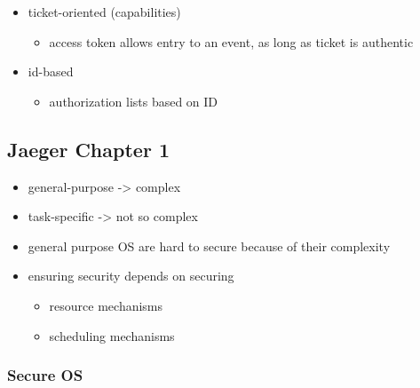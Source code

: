 \documentclass[
  12pt]{findlay}
\providecommand{\tightlist}{%
  \setlength{\itemsep}{0pt}\setlength{\parskip}{0pt}}
\begin{document}
\begin{itemize}
  \begin{itemize}
  \tightlist
  \item
    ticket-oriented (capabilities)

    \begin{itemize}
    \tightlist
    \item
      access token allows entry to an event, as long as ticket is
      authentic
    \end{itemize}
  \item
    id-based

    \begin{itemize}
    \tightlist
    \item
      authorization lists based on ID
    \end{itemize}
  \end{itemize}
\end{itemize}

\hypertarget{jaeger-chapter-1}{%
\subsection{Jaeger Chapter 1}\label{jaeger-chapter-1}}

\begin{itemize}
\tightlist
\item
  general-purpose -\textgreater{} complex
\item
  task-specific -\textgreater{} not so complex
\item
  general purpose OS are hard to secure because of their complexity
\item
  ensuring security depends on securing

  \begin{itemize}
  \tightlist
  \item
    resource mechanisms
  \item
    scheduling mechanisms
  \end{itemize}
\end{itemize}

\hypertarget{secure-os}{%
\subsubsection{Secure OS}\label{secure-os}}
\end{document}
